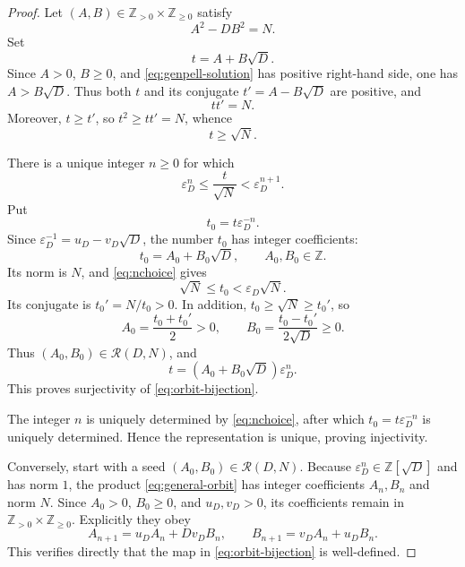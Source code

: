 \documentclass[a4paper,11pt]{amsart}
\numberwithin{equation}{section}
\theoremstyle{definition}
\theoremstyle{remark}
\newcommand{\Z}{\mathbb Z}
\newcommand{\eps}{\varepsilon}
\newcommand{\Rcal}{\mathcal R}
\begin{document}
\begin{proof}
Let \((A,B)\in\Z_{>0}\times\Z_{\geq0}\) satisfy
\begin{equation}\label{eq:genpell-solution}
 A^2-DB^2=N.
\end{equation}
Set
\begin{equation}\label{eq:tdef}
 t=A+B\sqrt D.
\end{equation}
Since \(A>0\), \(B\geq0\), and \eqref{eq:genpell-solution} has positive
right-hand side, one has \(A>B\sqrt D\).  Thus both \(t\) and its conjugate
\(t'=A-B\sqrt D\) are positive, and
\begin{equation}\label{eq:ttprime}
 tt'=N.
\end{equation}
Moreover, \(t\geq t'\), so \(t^2\geq tt'=N\), whence
\begin{equation}\label{eq:t-lower}
 t\geq\sqrt N.
\end{equation}

There is a unique integer \(n\geq0\) for which
\begin{equation}\label{eq:nchoice}
 \eps_D^n\leq\frac{t}{\sqrt N}<\eps_D^{n+1}.
\end{equation}
Put
\begin{equation}\label{eq:t0def}
 t_0=t\eps_D^{-n}.
\end{equation}
Since \(\eps_D^{-1}=u_D-v_D\sqrt D\), the number \(t_0\) has integer
coefficients:
\begin{equation}\label{eq:t0coeff}
 t_0=A_0+B_0\sqrt D,
 \qquad A_0,B_0\in\Z.
\end{equation}
Its norm is \(N\), and \eqref{eq:nchoice} gives
\begin{equation}\label{eq:t0interval}
 \sqrt N\leq t_0<\eps_D\sqrt N.
\end{equation}
Its conjugate is \(t_0'=N/t_0>0\).  In addition,
\(t_0\geq\sqrt N\geq t_0'\), so
\begin{equation}\label{eq:A0B0positive}
 A_0=\frac{t_0+t_0'}2>0,
 \qquad
 B_0=\frac{t_0-t_0'}{2\sqrt D}\geq0.
\end{equation}
Thus \((A_0,B_0)\in\Rcal(D,N)\), and
\begin{equation*}
 t=(A_0+B_0\sqrt D)\eps_D^n.
\end{equation*}
This proves surjectivity of \eqref{eq:orbit-bijection}.

The integer \(n\) is uniquely determined by \eqref{eq:nchoice}, after which
\(t_0=t\eps_D^{-n}\) is uniquely determined.  Hence the representation is
unique, proving injectivity.

Conversely, start with a seed \((A_0,B_0)\in\Rcal(D,N)\).  Because
\(\eps_D^n\in\Z[\sqrt D]\) and has norm \(1\), the product
\eqref{eq:general-orbit} has integer coefficients \(A_n,B_n\) and norm
\(N\).  Since \(A_0>0\), \(B_0\geq0\), and \(u_D,v_D>0\), its coefficients
remain in \(\Z_{>0}\times\Z_{\geq0}\).  Explicitly they obey
\begin{equation}\label{eq:general-recurrence}
 A_{n+1}=u_DA_n+Dv_DB_n,
 \qquad
 B_{n+1}=v_DA_n+u_DB_n.
\end{equation}
This verifies directly that the map in \eqref{eq:orbit-bijection} is
well-defined.


\end{proof}
\end{document}

